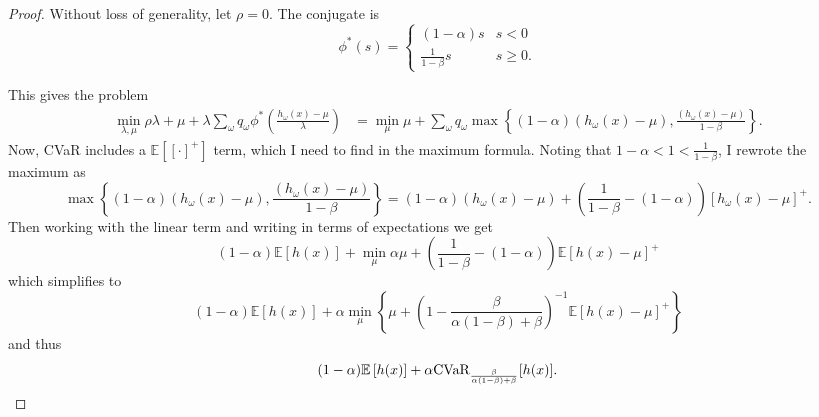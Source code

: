\documentclass[11pt]{article}
\newcommand{\E}{\mathbb{E}}
\newcommand{\e}[1]{\E \left[ #1 \right]}
\begin{document}
\begin{proof}
	Without loss of generality, let $\rho = 0$.
	The conjugate is
	\[
		\phi^*(s) = 
		\begin{cases}
			(1-\alpha) s & s < 0 \\
			\frac{1}{1-\beta} s & s \geq 0.
		\end{cases}
	\]
	
	This gives the problem
	\begin{align*}
		\min_{\lambda,\mu} \rho \lambda + \mu + \lambda \sum_\omega q_\omega \phi^*\left(\frac{h_\omega(x)-\mu}{\lambda}\right) & = \min_\mu \mu + \sum_\omega q_\omega \max \left\{ (1-\alpha)(h_\omega(x)-\mu), \frac{(h_\omega(x)-\mu)}{1-\beta} \right\}.
	\end{align*}
	Now, CVaR includes a $\e{[\cdot]^+}$ term, which I need to find in the maximum formula.
	Noting that $1-\alpha < 1 < \frac{1}{1-\beta}$, I rewrote the maximum as
	\[
		\max \left\{ (1-\alpha)(h_\omega(x)-\mu), \frac{(h_\omega(x)-\mu)}{1-\beta} \right\} = (1-\alpha)(h_\omega(x)-\mu) + \left( \frac{1}{1-\beta} - (1-\alpha) \right) \left[ h_\omega(x)-\mu \right]^+.
	\]
	Then working with the linear term and writing in terms of expectations we get
	\[
		(1-\alpha)\e{h(x)} + \min_\mu \alpha\mu + \left( \frac{1}{1-\beta} - (1-\alpha) \right) \e{h(x)-\mu}^+
	\]
	which simplifies to
	\[
		(1-\alpha)\e{h(x)} + \alpha \min_\mu \left\{ \mu + \left(1 - \frac{\beta}{\alpha(1-\beta)+\beta}\right)^{-1} \e{h(x)-\mu}^+ \right\}
	\]
	and thus
	\[
		(1-\alpha)\e{h(x)} + \alpha \mbox{CVaR}_{\frac{\beta}{\alpha(1-\beta)+\beta}}[h(x)]. \qedhere
	\]
\end{proof}
\end{document}
